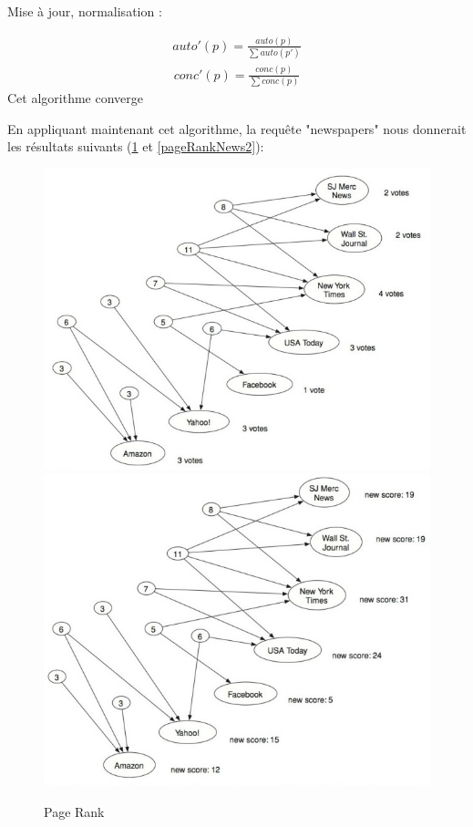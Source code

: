  Mise à jour, normalisation :
 
 \begin{align*}
 auto'(p) = \frac{auto (p)}{\sum auto(p')}
 \end{align*}
 \begin{align*}
 conc' (p) = \frac{conc (p)}{\sum conc(p)}
 \end{align*}
 Cet algorithme converge


En appliquant maintenant cet algorithme, la requête "newspapers" nous donnerait les résultats suivants (\ref{pageRankNews1} et \ref{pageRankNews2}):


\begin{figure}[!ht]
\centering
\includegraphics[scale=0.45]{images/ref/fig-14-2.jpeg}
\includegraphics[scale=0.45]{images/ref/fig-14-3.jpeg}
\caption{Page Rank}
\label{pageRankNews1}
\end{figure}

